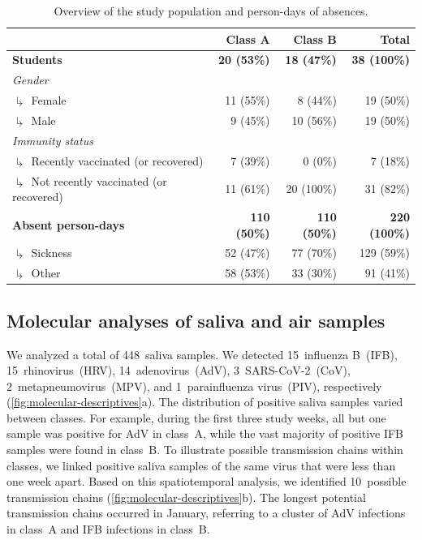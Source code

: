\documentclass[fleqn,11pt]{wlscirep}
\begin{document}
\begin{table}[!htpb]
    \centering
    \caption{Overview of the study population and person-days of absences.}
    \label{tab:cases-overview-school}
    \footnotesize
    \renewcommand{\arraystretch}{1.5}
    \begin{tabular}{l r r r}
    \toprule
         &  Class A & Class B & Total \\ \midrule 
        \textbf{Students} & \textbf{20 (53\%)} & \textbf{18 (47\%)} & \textbf{38 (100\%)} \\
        \emph{Gender} \\
        $\drsh$ Female & 11 (55\%) & 8 (44\%) & 19 (\hphantom{0}50\%) \\
        $\drsh$ Male & 9 (45\%) & 10 (56\%) & 19 (\hphantom{0}50\%) \\
        \emph{Immunity status} \\
        $\drsh$ Recently vaccinated (or recovered) & 7 (39\%) & 0 (0\%) & 7 (\hphantom{0}18\%) \\
        $\drsh$ Not recently vaccinated (or recovered) & 11 (61\%) & 20 (100\%) & 31 (\hphantom{0}82\%) \\
        \textbf{Absent person-days} & \textbf{110 (50\%)} & \textbf{110 (50\%)} & \textbf{220 (100\%)} \\
        $\drsh$ Sickness & 52 (47\%) & 77 (70\%) & 129 (\hphantom{0}59\%) \\
        $\drsh$ Other & 58 (53\%) & 33 (30\%) & 91 (\hphantom{0}41\%) \\
        \bottomrule
    \end{tabular} 
\end{table}

\subsection{Molecular analyses of saliva and air samples}

We analyzed a total of 448~saliva samples. We detected 15~influenza B~(IFB), 15~rhinovirus~(HRV), 14~adenovirus~(AdV), 3~SARS-CoV-2~(CoV), 2~metapneumovirus~(MPV), and 1~parainfluenza virus~(PIV), respectively (\cref{fig:molecular-descriptives}a). The distribution of positive saliva samples varied between classes. For example, during the first three study weeks, all but one sample was positive for AdV in class~A, while the vast majority of positive IFB samples were found in class~B. To illustrate possible transmission chains within classes, we linked positive saliva samples of the same virus that were less than one week apart. Based on this spatiotemporal analysis, we identified 10~possible transmission chains (\cref{fig:molecular-descriptives}b). The longest potential transmission chains occurred in January, referring to a cluster of AdV infections in class~A and IFB infections in class~B. 
\end{document}
